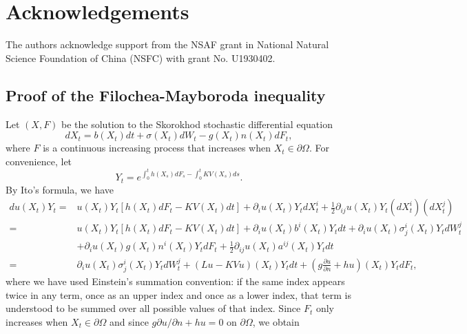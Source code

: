 \documentclass[a4paper,11pt]{article}
\begin{document}
\section*{Acknowledgements}
The authors acknowledge support from the NSAF grant in National Natural Science Foundation of China (NSFC) with grant No. U1930402.

\setlength{\bibsep}{5pt}
\small



\begin{appendices}

\section{Proof of the Filochea-Mayboroda inequality}\label{AppendixA}

Let $(X, F)$ be the solution to the Skorokhod stochastic differential equation
\begin{equation*}
d X_t = b(X_t) dt + \sigma(X_t) d W_t - g(X_t) n(X_t) d F_t,
\end{equation*}
where $F$ is a continuous increasing process that increases when $X_t \in \partial \Omega$. For convenience, let
\begin{equation*}
Y_t = e^{\int_{0}^{t} h(X_s) d F_s - \int_{0}^{t} K V(X_s) ds}.
\end{equation*}
By Ito's formula, we have
\begin{equation*}
\begin{split}
du(X_t) Y_t = & u(X_t) Y_t [h(X_t) dF_t - K V(X_t) dt] + \partial_i u(X_t) Y_t dX^i_t + \frac{1}{2} \partial_{ij} u(X_t) Y_t (dX^i_t) (dX^j_t) \\
= & u(X_t) Y_t [h(X_t) dF_t - K V(X_t) dt] + \partial_i u(X_t) b^i(X_t) Y_t dt + \partial_i u(X_t) \sigma^i_j(X_t) Y_t dW^j_t \\
& + \partial_i u(X_t) g(X_t) n^i(X_t) Y_t dF_t + \frac{1}{2} \partial_{ij} u(X_t) a^{ij}(X_t) Y_t dt\\
= & \partial_i u(X_t) \sigma^i_j(X_t) Y_t dW^j_t + (L u - K V u) (X_t) Y_t dt
+\left( g \frac{\partial u}{\partial n} + h u \right) (X_t) Y_t dF_t,
\end{split}
\end{equation*}
where we have used Einstein's summation convention: if the same index appears twice in any term, once as an upper index and once as a lower index, that term is understood to be summed over all possible values of that index. Since $F_t$ only increases when $X_t \in \partial \Omega$ and since $g \partial u/\partial n + h u = 0$ on $\partial \Omega$, we obtain

\end{appendices}
\end{document}
